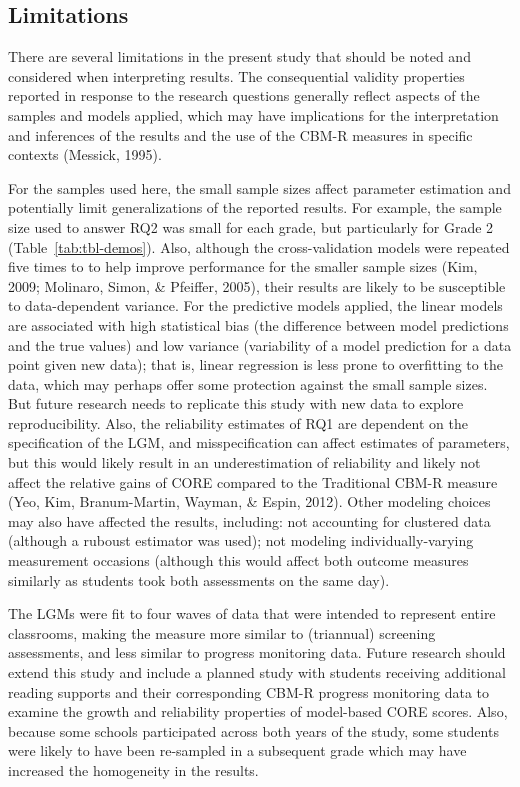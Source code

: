 \documentclass[
  english,
  man, fleqn, noextraspace]{apa6}
\begin{document}
\hypertarget{limitations}{%
\subsection{Limitations}\label{limitations}}

There are several limitations in the present study that should be noted and considered when interpreting results. The consequential validity properties reported in response to the research questions generally reflect aspects of the samples and models applied, which may have implications for the interpretation and inferences of the results and the use of the CBM-R measures in specific contexts (Messick, 1995).

For the samples used here, the small sample sizes affect parameter estimation and potentially limit generalizations of the reported results. For example, the sample size used to answer RQ2 was small for each grade, but particularly for Grade 2 (Table~\ref{tab:tbl-demos}). Also, although the cross-validation models were repeated five times to to help improve performance for the smaller sample sizes (Kim, 2009; Molinaro, Simon, \& Pfeiffer, 2005), their results are likely to be susceptible to data-dependent variance. For the predictive models applied, the linear models are associated with high statistical bias (the difference between model predictions and the true values) and low variance (variability of a model prediction for a data point given new data); that is, linear regression is less prone to overfitting to the data, which may perhaps offer some protection against the small sample sizes. But future research needs to replicate this study with new data to explore reproducibility. Also, the reliability estimates of RQ1 are dependent on the specification of the LGM, and misspecification can affect estimates of parameters, but this would likely result in an underestimation of reliability and likely not affect the relative gains of CORE compared to the Traditional CBM-R measure (Yeo, Kim, Branum-Martin, Wayman, \& Espin, 2012). Other modeling choices may also have affected the results, including: not accounting for clustered data (although a ruboust estimator was used); not modeling individually-varying measurement occasions (although this would affect both outcome measures similarly as students took both assessments on the same day).

The LGMs were fit to four waves of data that were intended to represent entire classrooms, making the measure more similar to (triannual) screening assessments, and less similar to progress monitoring data. Future research should extend this study and include a planned study with students receiving additional reading supports and their corresponding CBM-R progress monitoring data to examine the growth and reliability properties of model-based CORE scores. Also, because some schools participated across both years of the study, some students were likely to have been re-sampled in a subsequent grade which may have increased the homogeneity in the results.
\end{document}
